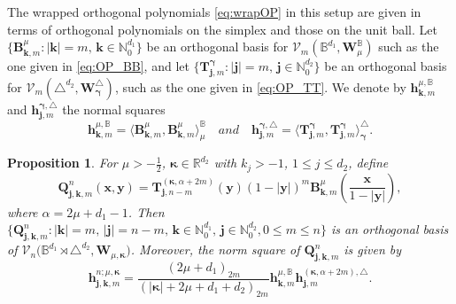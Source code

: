 \documentclass{amsart}
\newtheorem{prop}[thm]{Proposition}
\theoremstyle{remark}
\def\la{{\langle}}
\def\ra{{\rangle}}
\def\a{{\alpha}}
\def\la{{\langle}}
\def\ra{{\rangle}}
\def\Qb{{\bm Q}}
\def\CV{{\mathcal V}}
\def\BB{{\mathbb B}}
\def\NN{{\mathbb N}}
\def\RR{{\mathbb R}}
\def\bg{{\boldsymbol{\gamma}}}
\def\bk{{\boldsymbol{\kappa}}}
\def\f{\frac}
\begin{document}
The wrapped orthogonal polynomials \eqref{eq:wrapOP} in this setup are given in terms of orthogonal polynomials 
on the simplex and those on the unit ball. 
Let $\{\bm B_{\bm k, m}^{\mu}: |\bm k|= m, \, \bm k \in \NN_0^{d_1}\}$ be an orthogonal basis for 
$\CV_m(\BB^{d_1},\bm W^\BB_\mu)$ such as the one given in \eqref{eq:OP_BB}, and let 
$\{\bm T_{\bm j, m}^{\bg}: |\bm j| = m, \, \bm j\in \NN_0^{d_2}\}$ be an orthogonal basis for
$\CV_{m}\left(\triangle^{d_2},\bm W^\triangle_{\bg}\right)$, such as the one given in \eqref{eq:OP_TT}. 
We denote by $\bm h_{\bm k,m}^{\mu,\BB}$ and $\bm h_{\bm j,m}^{\bg,\triangle}$ the normal squares
$$
  \bm h_{\bm k,m}^{\mu, \BB} =  \langle \bm B_{\bm k, m}^{\mu}, \bm B_{\bm k, m}^{\mu}\rangle_{\mu}^\BB
 \quad and \quad \bm h_{\bm j,m}^{\bg,\triangle} = \langle \bm T_{\bm j, m}^{\bg}, \bm T_{\bm j, m}^{\bg}  \rangle_{\bg}^\triangle.
$$

\begin{prop}
For $\mu > - \f12$, $\bk \in \RR^{d_2}$ with $k_j > -1$, $1 \le j \le d_2$, define 
\begin{equation} \label{eq:OP_BT}
 \bm Q_{\bm j, \bm k, m}^n(\bm x,\bm y) = \bm T_{\bm j, n-m}^{(\bk, \alpha+2m)}(\bm y) (1-|\bm y|)^m 
      \bm B_{\bm k, m}^\mu \left(\frac{\bm x}{1-|\bm y| }\right),
\end{equation}
where $\alpha = 2 \mu + d_1-1$. Then
$\{\bm Q_{\bm j, \bm k, m}^n: |\bm k| = m, \, |\bm j| = n-m, \, \bm k \in \NN_0^{d_1}, \, \bm j \in \NN_0^{d_2}, 0\le m \le n\}$ 
is an orthogonal basis of $\CV_n\big(\BB^{d_1}\!\! \rtimes\triangle^{d_2}, \bm W_{\mu, \bk}\big)$. 
Moreover, the norm square of $\bm Q_{\bm j, \bm k, m}^n$ is given by 
\begin{equation} \label{eq:OP_BT_Norm}
   \bm h_{\bm j, \bm k, m}^{n; \mu,\bk}  %
       = \frac{(2\mu+d_1)_{2m}} {(|\bk|+ 2\mu + d_1 + d_2)_{2m}}\bm h_{\bm k,m}^{\mu, \BB}  
       \bm h_{\bm j,m}^{(\bk, \a+2m), \triangle}. 
\end{equation}
\end{prop}
 
\end{document}
